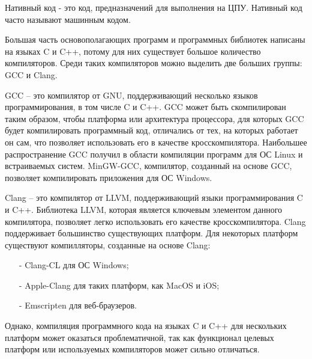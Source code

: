 Нативный код - это код, предназначений для выполнения на ЦПУ.
Нативный код часто называют машинным кодом.

Большая часть основополагающих программ и программных библиотек написаны на языках C и C++, потому для них существует большое количество компиляторов.
Среди таких компиляторов можно выделить две больших группы: GCC и Clang.

GCC -- это компилятор от GNU, поддерживающий несколько языков программирования, в том числе C и C++. 
GCC может быть скомпилирован таким образом, чтобы платформа или архитектура процессора, для которых GCC будет компилировать программный код, отличались от тех, на которых работает он сам, что позволяет использовать его в качестве кросскомпилятора.
Наибольшее распространение GCC получил в области компиляции программ для ОС Linux и встраиваемых систем.
MinGW-GCC, компилятор, созданный на основе GCC, позволяет компилировать приложения для ОС Windows.

Clang -- это компилятор от LLVM, поддерживающий языки программирования C и C++.
Библиотека LLVM, которая является ключевым элементом данного компилятора, позволяет легко использовать его качестве кросскомпилятора. 
Clang поддерживает большинство существующих платформ. Для некоторых платформ существуют компилляторы, созданные на основе Clang:
\begin{itemize}
    \item[-] Clang-CL для ОС Windows;
    \item[-] Apple-Clang для таких платформ, как MacOS и iOS;
    \item[-] Emscripten для веб-браузеров.
\end{itemize}

Однако, компиляция программного кода на языках C и C++ для нескольких платформ может оказаться проблематичной, так как функционал целевых платформ или используемых компиляторов может сильно отличаться.



